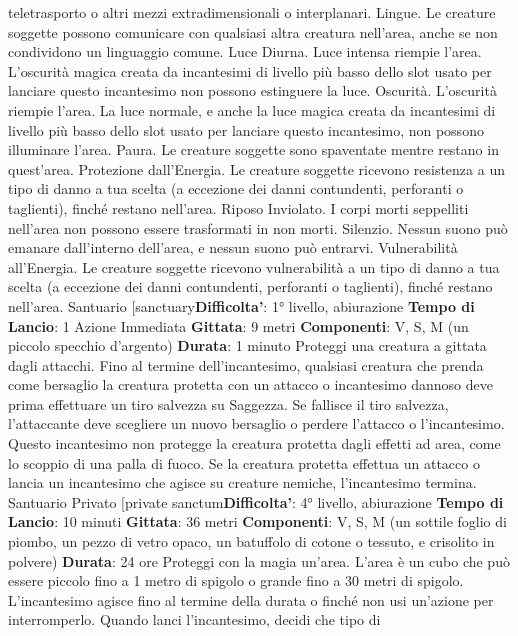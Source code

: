 \begin{multicols}{2}
teletrasporto o altri mezzi extradimensionali o
interplanari.
Lingue. Le creature soggette possono comunicare con
qualsiasi altra creatura nell’area, anche se non
condividono un linguaggio comune.
Luce Diurna. Luce intensa riempie l’area. L’oscurità
magica creata da incantesimi di livello più basso dello
slot usato per lanciare questo incantesimo non possono
estinguere la luce.
Oscurità. L’oscurità riempie l’area. La luce normale, e
anche la luce magica creata da incantesimi di livello più
basso dello slot usato per lanciare questo incantesimo,
non possono illuminare l’area.
Paura. Le creature soggette sono spaventate mentre
restano in quest’area.
Protezione dall’Energia. Le creature soggette
ricevono resistenza a un tipo di danno a tua scelta (a
eccezione dei danni contundenti, perforanti o taglienti),
finché restano nell’area.
Riposo Inviolato. I corpi morti seppelliti nell’area non
possono essere trasformati in non morti.
Silenzio. Nessun suono può emanare dall’interno
dell’area, e nessun suono può entrarvi.
Vulnerabilità all’Energia. Le creature soggette
ricevono vulnerabilità a un tipo di danno a tua scelta (a
eccezione dei danni contundenti, perforanti o taglienti),
finché restano nell’area.
Santuario
[sanctuary\textbf{Difficolta'}:
1° livello, abiurazione
\textbf{Tempo di Lancio}: 1 Azione Immediata
\textbf{Gittata}: 9 metri
\textbf{Componenti}: V, S, M (un piccolo specchio d’argento)
\textbf{Durata}: 1 minuto
Proteggi una creatura a gittata dagli attacchi. Fino al
termine dell’incantesimo, qualsiasi creatura che prenda
come bersaglio la creatura protetta con un attacco o
incantesimo dannoso deve prima effettuare un tiro
salvezza su Saggezza. Se fallisce il tiro salvezza,
l’attaccante deve scegliere un nuovo bersaglio o
perdere l’attacco o l’incantesimo. Questo incantesimo
non protegge la creatura protetta dagli effetti ad area,
come lo scoppio di una palla di fuoco.
Se la creatura protetta effettua un attacco o lancia un
incantesimo che agisce su creature nemiche,
l’incantesimo termina.
Santuario Privato
[private sanctum\textbf{Difficolta'}:
4° livello, abiurazione
\textbf{Tempo di Lancio}: 10 minuti
\textbf{Gittata}: 36 metri
\textbf{Componenti}: V, S, M (un sottile foglio di piombo, un
pezzo di vetro opaco, un batuffolo di cotone o tessuto, e
crisolito in polvere)
\textbf{Durata}: 24 ore
Proteggi con la magia un’area. L’area è un cubo che
può essere piccolo fino a 1 metro di spigolo o grande
fino a 30 metri di spigolo. L’incantesimo agisce fino al
termine della durata o finché non usi un’azione per
interromperlo.
Quando lanci l’incantesimo, decidi che tipo di

\end{multicols}
